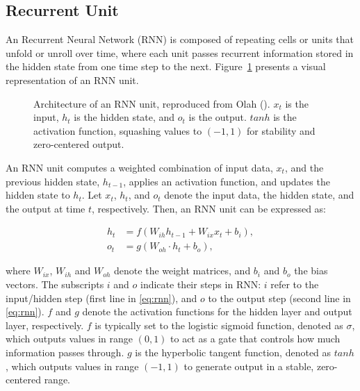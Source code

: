 \documentclass[
  letterpaper,
  double,
  12pt,
  1.0in]{beavtex}
\begin{document}
\subsection{Recurrent Unit}\label{recurrent-unit}

An Recurrent Neural Network (RNN) is composed of repeating cells or
units that unfold or unroll over time, where each unit passes recurrent
information stored in the hidden state from one time step to the next.
Figure~\ref{fig-rnn} presents a visual representation of an RNN unit.

\begin{figure}


\caption{\label{fig-rnn}Architecture of an RNN unit, reproduced from
Olah (). \(x_t\) is the
input, \(h_t\) is the hidden state, and \(o_t\) is the output. \(tanh\)
is the activation function, squashing values to \((-1, 1)\) for
stability and zero-centered output.}

\end{figure}%

An RNN unit computes a weighted combination of input data, \(x_t\), and
the previous hidden state, \(h_{t-1}\), applies an activation function,
and updates the hidden state to \(h_t\). Let \(x_t\), \(h_t\), and
\(o_t\) denote the input data, the hidden state, and the output at time
\(t\), respectively. Then, an RNN unit can be expressed as:

\begin{equation}
\begin{split}
\label{eq:rnn}
h_t &= f(W_{ih} h_{t-1} + W_{ix} x_t + b_i), \\
o_t &= g(W_{oh} \cdot h_t + b_o), 
\end{split}
\end{equation}

where \(W_{ix}\), \(W_{ih}\) and \(W_{oh}\) denote the weight matrices,
and \(b_i\) and \(b_o\) the bias vectors. The subscripts \(i\) and \(o\)
indicate their steps in RNN: \(i\) refer to the input/hidden step (first
line in \eqref{eq:rnn}), and \(o\) to the output step (second line in
\eqref{eq:rnn}). \(f\) and \(g\) denote the activation functions for the
hidden layer and output layer, respectively. \(f\) is typically set to
the logistic sigmoid function, denoted as \(\sigma\), which outputs
values in range \((0, 1)\) to act as a gate that controls how much
information passes through. \(g\) is the hyperbolic tangent function,
denoted as \(tanh\), which outputs values in range \((-1, 1)\) to
generate output in a stable, zero-centered range.
\end{document}

